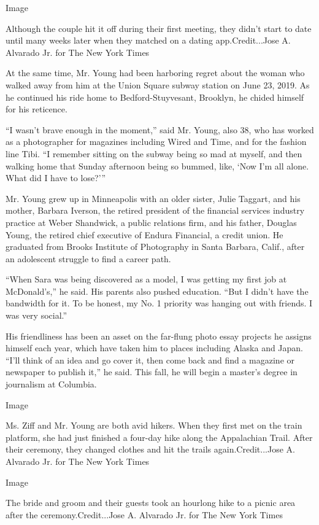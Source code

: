 Image

Although the couple hit it off during their first meeting, they didn't
start to date until many weeks later when they matched on a dating
app.Credit...Jose A. Alvarado Jr. for The New York Times

At the same time, Mr. Young had been harboring regret about the woman
who walked away from him at the Union Square subway station on June 23,
2019. As he continued his ride home to Bedford-Stuyvesant, Brooklyn, he
chided himself for his reticence.

``I wasn't brave enough in the moment,'' said Mr. Young, also 38, who
has worked as a photographer for magazines including Wired and Time, and
for the fashion line Tibi. ``I remember sitting on the subway being so
mad at myself, and then walking home that Sunday afternoon being so
bummed, like, `Now I'm all alone. What did I have to lose?'''

Mr. Young grew up in Minneapolis with an older sister, Julie Taggart,
and his mother, Barbara Iverson, the retired president of the financial
services industry practice at Weber Shandwick, a public relations firm,
and his father, Douglas Young, the retired chief executive of Endura
Financial, a credit union. He graduated from Brooks Institute of
Photography in Santa Barbara, Calif., after an adolescent struggle to
find a career path.

``When Sara was being discovered as a model, I was getting my first job
at McDonald's,'' he said. His parents also pushed education. ``But I
didn't have the bandwidth for it. To be honest, my No. 1 priority was
hanging out with friends. I was very social.''

His friendliness has been an asset on the far-flung photo essay projects
he assigns himself each year, which have taken him to places including
Alaska and Japan. ``I'll think of an idea and go cover it, then come
back and find a magazine or newspaper to publish it,'' he said. This
fall, he will begin a master's degree in journalism at Columbia.

Image

Ms. Ziff and Mr. Young are both avid hikers. When they first met on the
train platform, she had just finished a four-day hike along the
Appalachian Trail. After their ceremony, they changed clothes and hit
the trails again.Credit...Jose A. Alvarado Jr. for The New York Times

Image

The bride and groom and their guests took an hourlong hike to a picnic
area after the ceremony.Credit...Jose A. Alvarado Jr. for The New York
Times

